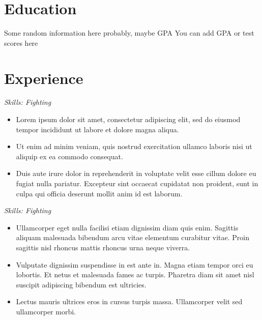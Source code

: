 \documentclass{resume}
\begin{document}
\makeheader 
\section{Education}
Some random information here probably, maybe GPA
You can add GPA or test scores here

\section{Experience}
\textit{Skills: Fighting}
\vspace{-0.5em}
\begin{itemize}
\setlength\itemsep{-0.3em}
  \item Lorem ipsum dolor sit amet, consectetur adipiscing elit, sed do eiusmod tempor incididunt ut labore et dolore magna aliqua. 
  \item Ut enim ad minim veniam, quis nostrud exercitation ullamco laboris nisi ut aliquip ex ea commodo consequat. 
  \item Duis aute irure dolor in reprehenderit in voluptate velit esse cillum dolore eu fugiat nulla pariatur. Excepteur sint occaecat cupidatat non proident, sunt in culpa qui officia deserunt mollit anim id est laborum.
\end{itemize}
\vspace{-1em}

\textit{Skills: Fighting}
\vspace{-0.5em}
\begin{itemize}
\setlength\itemsep{-0.3em}
  \item Ullamcorper eget nulla facilisi etiam dignissim diam quis enim. Sagittis aliquam malesuada bibendum arcu vitae elementum curabitur vitae. Proin sagittis nisl rhoncus mattis rhoncus urna neque viverra. 
  \item Vulputate dignissim suspendisse in est ante in. Magna etiam tempor orci eu lobortis. Et netus et malesuada fames ac turpis. Pharetra diam sit amet nisl suscipit adipiscing bibendum est ultricies. 
  \item Lectus mauris ultrices eros in cursus turpis massa. Ullamcorper velit sed ullamcorper morbi.
\end{itemize}
\vspace{-1em}
\end{document}
